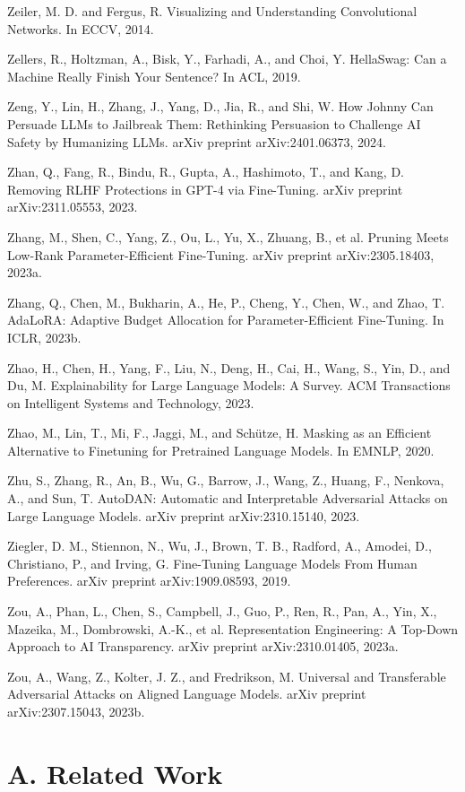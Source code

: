 \documentclass[10pt]{article}
\begin{document}
Zeiler, M. D. and Fergus, R. Visualizing and Understanding Convolutional Networks. In ECCV, 2014.

Zellers, R., Holtzman, A., Bisk, Y., Farhadi, A., and Choi, Y. HellaSwag: Can a Machine Really Finish Your Sentence? In ACL, 2019.

Zeng, Y., Lin, H., Zhang, J., Yang, D., Jia, R., and Shi, W. How Johnny Can Persuade LLMs to Jailbreak Them: Rethinking Persuasion to Challenge AI Safety by Humanizing LLMs. arXiv preprint arXiv:2401.06373, 2024.

Zhan, Q., Fang, R., Bindu, R., Gupta, A., Hashimoto, T., and Kang, D. Removing RLHF Protections in GPT-4 via Fine-Tuning. arXiv preprint arXiv:2311.05553, 2023.

Zhang, M., Shen, C., Yang, Z., Ou, L., Yu, X., Zhuang, B., et al. Pruning Meets Low-Rank Parameter-Efficient Fine-Tuning. arXiv preprint arXiv:2305.18403, 2023a.

Zhang, Q., Chen, M., Bukharin, A., He, P., Cheng, Y., Chen, W., and Zhao, T. AdaLoRA: Adaptive Budget Allocation for Parameter-Efficient Fine-Tuning. In ICLR, 2023b.

Zhao, H., Chen, H., Yang, F., Liu, N., Deng, H., Cai, H., Wang, S., Yin, D., and Du, M. Explainability for Large Language Models: A Survey. ACM Transactions on Intelligent Systems and Technology, 2023.

Zhao, M., Lin, T., Mi, F., Jaggi, M., and Schütze, H. Masking as an Efficient Alternative to Finetuning for Pretrained Language Models. In EMNLP, 2020.

Zhu, S., Zhang, R., An, B., Wu, G., Barrow, J., Wang, Z., Huang, F., Nenkova, A., and Sun, T. AutoDAN: Automatic and Interpretable Adversarial Attacks on Large Language Models. arXiv preprint arXiv:2310.15140, 2023.

Ziegler, D. M., Stiennon, N., Wu, J., Brown, T. B., Radford, A., Amodei, D., Christiano, P., and Irving, G. Fine-Tuning Language Models From Human Preferences. arXiv preprint arXiv:1909.08593, 2019.

Zou, A., Phan, L., Chen, S., Campbell, J., Guo, P., Ren, R., Pan, A., Yin, X., Mazeika, M., Dombrowski, A.-K., et al. Representation Engineering: A Top-Down Approach to AI Transparency. arXiv preprint arXiv:2310.01405, 2023a.

Zou, A., Wang, Z., Kolter, J. Z., and Fredrikson, M. Universal and Transferable Adversarial Attacks on Aligned Language Models. arXiv preprint arXiv:2307.15043, 2023b.

\section*{A. Related Work}
\end{document}
